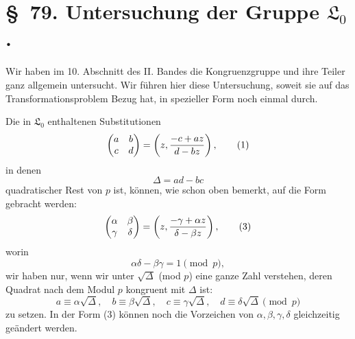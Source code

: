 \documentclass[11pt]{article}
\providecommand{\Lzero}{\mathfrak L_0}
\begin{document}
\section*{\S~79. Untersuchung der Gruppe $\Lzero$.}

Wir haben im 10. Abschnitt des II. Bandes die Kongruenzgruppe und ihre Teiler ganz allgemein untersucht. Wir führen hier diese Untersuchung, soweit sie auf das Transformationsproblem Bezug hat, in spezieller Form noch einmal durch.

Die in $\Lzero$ enthaltenen Substitutionen
\begin{equation}
 \begin{pmatrix}a&b\\ c&d\end{pmatrix}
 =\left(z,{ -c+az\over d-bz}\right),
\tag{1}
\end{equation}
in denen
\begin{equation}
 \Delta=ad-bc
\tag{2}
\end{equation}
quadratischer Rest von $p$ ist, können, wie schon oben bemerkt, auf die Form gebracht werden:
\begin{equation}
 \begin{pmatrix}\alpha&\beta\\ \gamma&\delta\end{pmatrix}
 =\left(z,{ -\gamma+\alpha z\over \delta-\beta z}\right),
\tag{3}
\end{equation}
worin
\begin{equation}
 \alpha\delta-\beta\gamma=1\pmod p,
\tag{4}
\end{equation}
wir haben nur, wenn wir unter $\sqrt\Delta$ (mod $p$) eine ganze Zahl verstehen, deren Quadrat nach dem Modul $p$ kongruent mit $\Delta$ ist:
\[
 a\equiv \alpha\sqrt\Delta,
 \quad b\equiv\beta\sqrt\Delta,
 \quad c\equiv\gamma\sqrt\Delta,
 \quad d\equiv\delta\sqrt\Delta\pmod p
\]
zu setzen. In der Form (3) können noch die Vorzeichen von $\alpha,\beta,\gamma,\delta$ gleichzeitig geändert werden.
\end{document}

